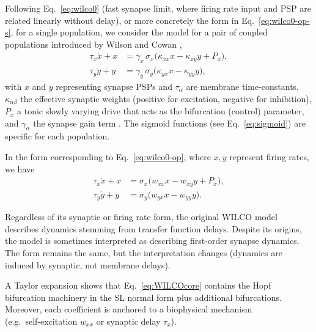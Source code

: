 \documentclass[12pt]{article}
\numberwithin{equation}{section}
\begin{document}
Following Eq.~\eqref{eq:wilco0} (fast synapse limit, where firing rate input and PSP are related linearly without delay), or more concretely the  form in Eq.~\eqref{eq:wilco0-op-s},  for a single population, we consider the  model for a pair of coupled populations introduced by Wilson and Cowan \cite{wilson_excitatory_1972},
\begin{equation}
    \begin{aligned}
  \tau_x \dot{x}+x &= \gamma_x\,\sigma_x\!\bigl(\kappa_{xx}x - \kappa_{xy}y + P_x\bigr),\\
  \tau_y \dot{y}+y &= \gamma_y\,\sigma_y\!\bigl(\kappa_{yx}x - \kappa_{yy}y\bigr),
  \label{eq:WILCOcore-psp}
\end{aligned}
\end{equation}
 with $x$ and $y$ representing synapse PSPs   and \(\tau_{\alpha}\) are membrane time‑constants, \(\kappa_{\alpha\beta}\) the effective synaptic weights (positive for excitation, negative for inhibition), \(P_x\) a tonic slowly varying drive that acts as the bifurcation (control) parameter, and \(\gamma_{\alpha}\) the synapse gain term 
\cite{Ermentrout2010}.  The sigmoid functions (see Eq.~\ref{eq:sigmoid}) are specific for each population.  

In the form  corresponding to Eq.~\eqref{eq:wilco0-op}, where $x,y$ represent firing rates, we have
\begin{equation}
\begin{aligned}
  \tau_x \dot{x}+x &=  \sigma_x\!\bigl(w_{xx}x - w_{xy}y + P_x\bigr),\\
  \tau_y \dot{y}+y &=  \sigma_y\!\bigl(w_{yx}x - w_{yy}y\bigr).
  \label{eq:WILCOcore}
\end{aligned}
\end{equation}


 
Regardless of its synaptic or firing rate form, the original WILCO model describes dynamics stemming from transfer function delays. 
Despite its origins, the model is sometimes interpreted as describing first-order synapse dynamics. The form remains the same, but the interpretation changes (dynamics are induced by synaptic, not membrane delays). 

A Taylor expansion shows that Eq.~\eqref{eq:WILCOcore} contains the  Hopf bifurcation machinery in the SL normal form plus additional bifurcations. Moreover,  each coefficient is anchored to a biophysical mechanism (e.g.\ self‑excitation \(w_{xx}\) or synaptic delay \(\tau_x\)).
\end{document}
